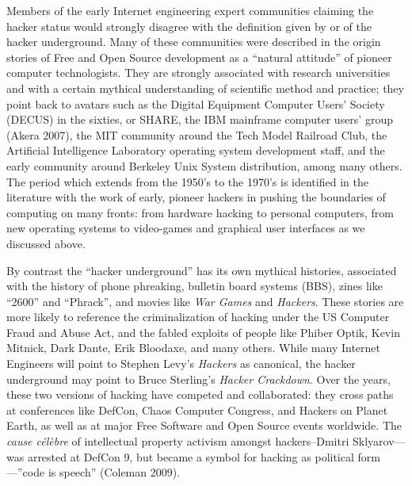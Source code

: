 \documentclass[10pt,letter,oneside]{scrartcl}
\begin{document}
Members of the early Internet engineering expert communities claiming the hacker
status would strongly disagree with the definition given by or of the hacker
underground. Many of these communities were described in the origin stories of
Free and Open Source development as a ``natural attitude'' of pioneer computer
technologists.  They are strongly associated with research universities and with
a certain mythical understanding of scientific method and practice; they point
back to avatars such as the Digital Equipment Computer Users' Society (DECUS) in
the sixties, or SHARE, the IBM mainframe computer users' group (Akera 2007), the
MIT community around the Tech Model Railroad Club, the Artificial Intelligence
Laboratory operating system development staff, and the early community around
Berkeley Unix System distribution, among many others.  The period which extends
from the 1950's to the 1970's is identified in the literature with the work of
early, pioneer hackers in pushing the boundaries of computing on many fronts:
from hardware hacking to personal computers, from new operating systems to
video-games and graphical user interfaces as we discussed above.

By contrast the ``hacker underground'' has its own mythical histories,
associated with the history of phone phreaking, bulletin board systems (BBS),
zines like ``2600'' and ``Phrack'', and movies like \emph{War Games} and \emph{Hackers}.
These stories are more likely to reference the criminalization of hacking under the 
US Computer Fraud and Abuse Act, and the fabled exploits of people like Phiber Optik, 
Kevin Mitnick, Dark Dante, Erik Bloodaxe, and many others.  While many Internet Engineers
will point to Stephen Levy's \emph{Hackers} as canonical, the hacker underground may point to Bruce Sterling's \emph{Hacker Crackdown}.  Over the years, these two versions 
of hacking have competed and collaborated: they cross paths at conferences like
DefCon, Chaos Computer Congress, and Hackers on Planet Earth, as well as at major 
Free Software and Open Source events worldwide.  The \emph{cause célèbre} of 
intellectual property activism amongst hackers--Dmitri Sklyarov---was arrested at 
DefCon 9, but became a symbol for hacking as political form---''code is 
speech'' (Coleman 2009). 


\end{document}

